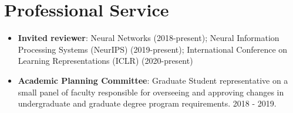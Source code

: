 \documentclass[a4paper,20pt]{article}
\begin{document}
\section{Professional Service}
\begin{itemize}
    \item \textbf{Invited reviewer}: Neural Networks (2018-present); Neural Information Processing Systems (NeurIPS) (2019-present); International Conference on Learning Representations (ICLR) (2020-present)
    \item \textbf{Academic Planning Committee}: Graduate Student representative on a small panel of faculty responsible for overseeing and approving changes in undergraduate and graduate degree program requirements. 2018 - 2019.
\end{itemize}

\pagebreak
\vspace{-5pt}
\end{document}
